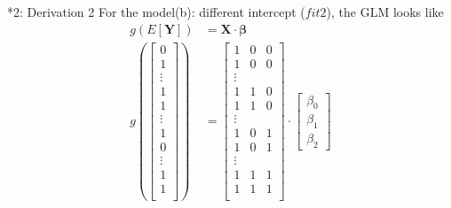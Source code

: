 \documentclass[10pt]{beamer}
\begin{document}
\begin{frame}{*2: Derivation 2}
For the model(b): different intercept ($fit2$), the GLM looks like 
\begin{align*}
g(E[\mathbf{Y}]) &= \mathbf{X} \cdot \mathbf{\beta}\\
    g( 
    \begin{bmatrix}
           0 \\
           1 \\
           \vdots \\
           1 \\
           1 \\
           \vdots \\
           1 \\
           0 \\
           \vdots \\
           1 \\
           1 \\
    \end{bmatrix} ) &= 
    \begin{bmatrix}
           1 & 0 & 0 \\
           1 & 0  & 0 \\
           \vdots \\
           1 & 1 & 0 \\
           1 & 1 & 0 \\
           \vdots \\
           1 & 0 & 1 \\
           1 & 0 & 1 \\
           \vdots \\
           1 & 1 & 1 \\
           1 & 1 & 1 \\
    \end{bmatrix} \cdot
    \begin{bmatrix}
           \beta_0 \\
           \beta_1 \\
           \beta_2 
    \end{bmatrix}
\end{align*}
\end{frame}
\end{document}

